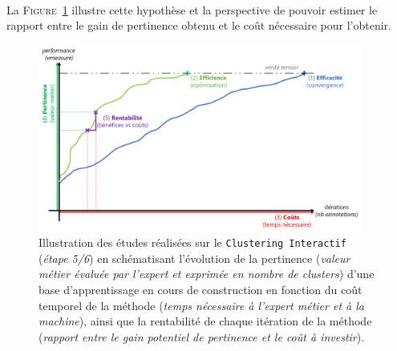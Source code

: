 	\begin{tcolorbox}[
		title=\faVial~\textbf{Hypothèse de rentabilité}~\faVial,
		colback=colorTcolorboxHypothesis!15,
		colframe=colorTcolorboxHypothesis!75,
		width=\linewidth
	]
		 \\
		
		La \textsc{Figure~\ref{figure:4.5-HYPOTHESE-RENTABILITE}} illustre cette hypothèse et la perspective de pouvoir estimer le rapport entre le gain de pertinence obtenu et le coût nécessaire pour l'obtenir.
		\begin{figure}[H]  %
			\centering
			\includegraphics[width=0.95\textwidth]{figures/hypotheses-05-rentabilite}
			\caption{
				Illustration des études réalisées sur le \texttt{Clustering Interactif} (\textit{étape 5/6}) en schématisant l'évolution de la pertinence (\textit{valeur métier évaluée par l'expert et exprimée en nombre de clusters}) d'une base d'apprentissage en cours de construction en fonction du coût temporel de la méthode (\textit{temps nécessaire à l'expert métier et à la machine}), ainsi que la rentabilité de chaque itération de la méthode (\textit{rapport entre le gain potentiel de pertinence et le coût à investir}).
			}
			\label{figure:4.5-HYPOTHESE-RENTABILITE}
		\end{figure}
	\end{tcolorbox}
		
